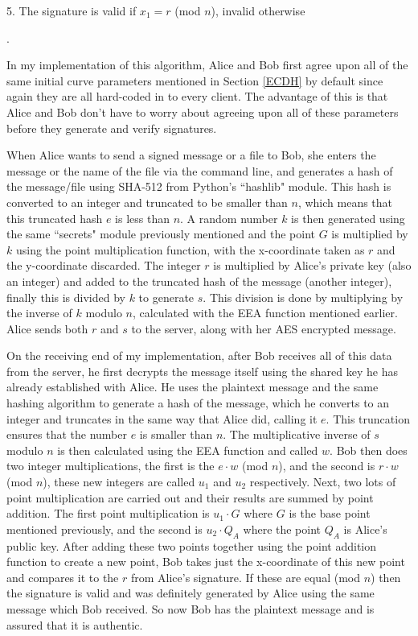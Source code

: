 \documentclass[12pt,a4paper]{article}
\begin{document}
5. \space The signature is valid if $x_1 = r$ (mod $n$), invalid otherwise

\vspace{2mm}

\cite{jurivsic1997elliptic,koblitz2000state,hankerson2003guide,anoop2007elliptic,silverman2009arithmetic,brown2009standards}.

\vspace{5mm}

In my implementation of this algorithm, Alice and Bob first agree upon all of the same initial curve parameters mentioned in Section \ref{ECDH} 
by default since again they are all hard-coded in to every client. 
The advantage of this is that Alice and Bob don't have to worry about agreeing upon all of these parameters before they generate and verify signatures. 

When Alice wants to send a signed message or a file to Bob, she enters the message or the name of the file via the command line, 
and generates a hash of the message/file using SHA-512 from Python's ``hashlib" module. 
This hash is converted to an integer and truncated to be smaller than $n$, which means that this truncated hash $e$ is less than $n$. 
A random number $k$ is then generated using the same ``secrets" module previously mentioned and the point $G$ is multiplied by $k$ using 
the point multiplication function, with the x-coordinate taken as $r$ and the y-coordinate discarded. 
The integer $r$ is multiplied by Alice's private key (also an integer) and added to the truncated hash of the message (another integer), 
finally this is divided by $k$ to generate $s$. 
This division is done by multiplying by the inverse of $k$ modulo $n$, calculated with the EEA function mentioned earlier. 
Alice sends both $r$ and $s$ to the server, along with her AES encrypted message. 

On the receiving end of my implementation, after Bob receives all of this data from the server, 
he first decrypts the message itself using the shared key he has already established with Alice. 
He uses the plaintext message and the same hashing algorithm to generate a hash of the message, 
which he converts to an integer and truncates in the same way that Alice did, calling it $e$. 
This truncation ensures that the number $e$ is smaller than $n$. 
The multiplicative inverse of $s$ modulo $n$ is then calculated using the EEA function and called $w$. 
Bob then does two integer multiplications, the first is the $e \cdot w$ (mod $n$), 
and the second is $r \cdot w$ (mod $n$), these new integers are called $u_1$ and $u_2$ respectively. 
Next, two lots of point multiplication are carried out and their results are summed by point addition. 
The first point multiplication is $u_1 \cdot G$ where $G$ is the base point mentioned previously, 
and the second is $u_2 \cdot Q_A$ where the point $Q_A$ is Alice's public key. 
After adding these two points together using the point addition function to create a new point, 
Bob takes just the x-coordinate of this new point and compares it to the $r$ from Alice's signature. 
If these are equal (mod $n$) then the signature is valid and was definitely generated by Alice using the same message which Bob received. 
So now Bob has the plaintext message and is assured that it is authentic. 
\end{document}
